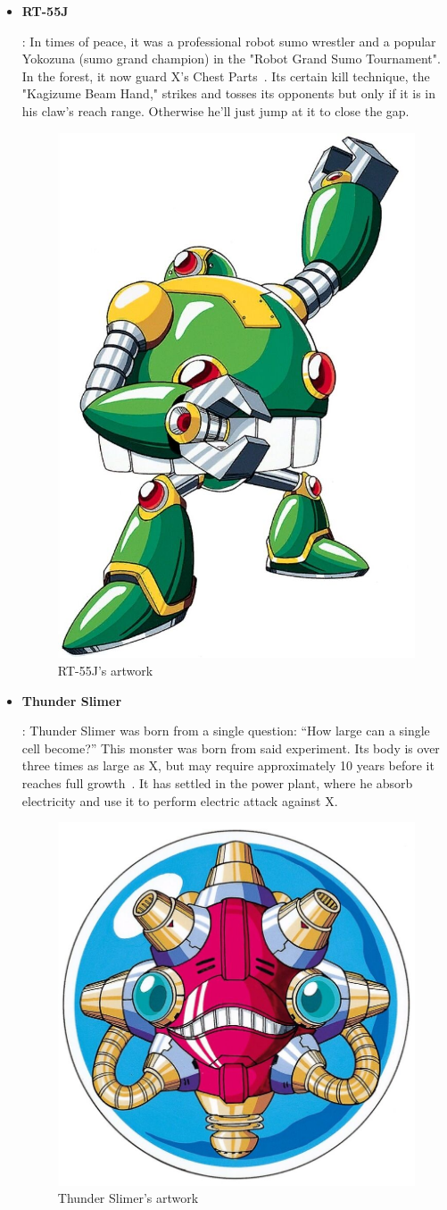 \begin{itemize}
		\item \hypertarget{miniboss:RT-55J}{\textbf{RT-55J}}: In times of peace, it was a professional robot sumo wrestler and a popular Yokozuna (sumo grand champion) in the "Robot Grand Sumo Tournament". In the forest, it now guard X's  Chest Parts~\cite{wayback:X_resources}. Its certain kill technique, the "Kagizume Beam Hand," strikes and tosses its opponents but only if it is in his claw's reach range. Otherwise he'll just jump at it to close the gap.
		\begin{figure}[htp]
			\centering
			\includegraphics[width=0.4\linewidth]{figures/X1/Enemies/RT-55J.jpg}
			\caption{RT-55J's artwork}
		\end{figure}
	
		\item \hypertarget{miniboss:Thunder_Slimer}{\textbf{Thunder Slimer}}: Thunder Slimer was born from a single question: ``How large can a single cell become?'' This monster was born from said experiment. Its body is over three times as large as X, but may require approximately 10 years before it reaches full growth~\cite{wayback:X_resources}. It has settled in the power plant, where he absorb electricity and use it to perform electric attack against X.
		\begin{figure}[htp]
			\centering
			\includegraphics[width=0.4\linewidth]{figures/X1/Enemies/ThunderSlimer.jpg}
			\caption{Thunder Slimer's artwork}
		\end{figure}
	

\end{itemize}
